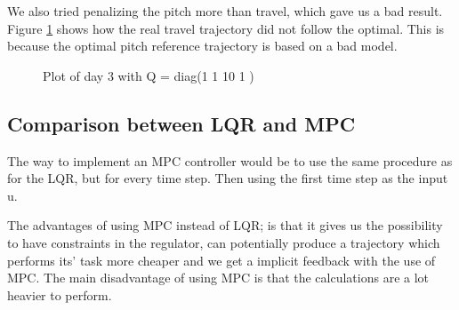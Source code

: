 We also tried penalizing the pitch more than travel, which gave us a bad result. Figure \ref{fig:day3_plot_1_1_10_1} shows how the real travel trajectory did not follow the optimal. This is because the optimal pitch reference trajectory is based on a bad model.
\begin{figure}[htb]
	\centering
	\caption{Plot of day 3 with Q = diag(1 1 10 1 )}
	\label{fig:day3_plot_1_1_10_1}
\end{figure}

\subsection{Comparison between LQR and MPC}
The way to implement an MPC controller would be to use the same procedure as for the LQR, but for every time step. Then using the first time step as the input u.

The advantages of using MPC instead of LQR; is that it gives us the possibility to have constraints in the regulator, can potentially produce a trajectory which performs its' task more cheaper and we get a implicit feedback with the use of MPC.
The main disadvantage of using MPC is that the calculations are a lot heavier to perform.
